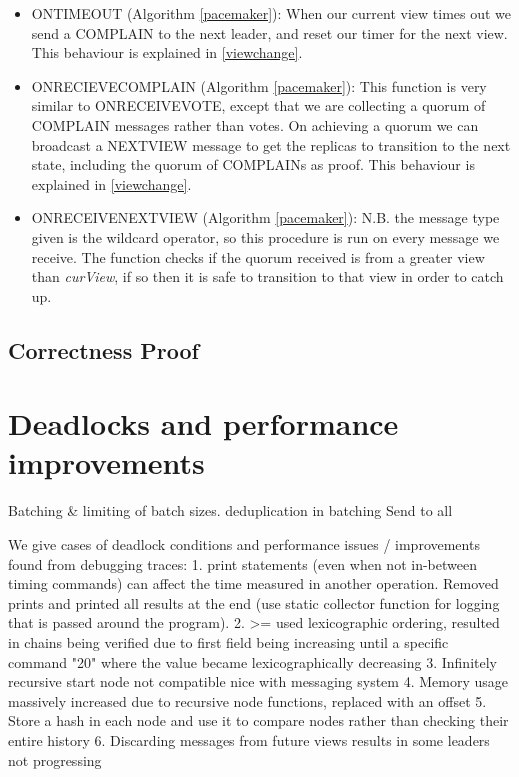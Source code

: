 \begin{itemize}
	\item ON{\large T}IMEOUT (Algorithm \ref{pacemaker}): When our current view times out we send a COMPLAIN to the next leader, and reset our timer for the next view. This behaviour is explained in \ref{viewchange}.
	\item ON{\large R}ECIEVE{\large C}OMPLAIN (Algorithm \ref{pacemaker}): This function is very similar to ON{\large R}ECEIVE{\large V}OTE, except that we are collecting a quorum of COMPLAIN messages rather than votes. On achieving a quorum we can broadcast a NEXT{\large V}IEW message to get the replicas to transition to the next state, including the quorum of COMPLAINs as proof. This behaviour is explained in \ref{viewchange}.
	\item ON{\large R}ECEIVE{\large N}EXT{\large V}IEW (Algorithm \ref{pacemaker}): N.B. the message type given is the wildcard operator, so this procedure is run on every message we receive. The function checks if the quorum received is from a greater view than \textit{curView}, if so then it is safe to transition to that view in order to catch up.
\end{itemize}

\subsection{Correctness Proof}

\section{Deadlocks and performance improvements} \label{deadlock}
Batching \& limiting of batch sizes. deduplication in batching
Send to all

We give cases of deadlock conditions
and performance issues / improvements found from debugging traces:
1. print statements (even when not in-between timing commands) can affect the time measured in another operation. Removed prints and printed all results at the end (use static collector function for logging that is passed around the program).
2. >= used lexicographic ordering, resulted in chains being verified due to first field being increasing until a specific command "20" where the value became lexicographically decreasing
3. Infinitely recursive start node not compatible nice with messaging system
4. Memory usage massively increased due to recursive node functions, replaced with an offset
5. Store a hash in each node and use it to compare nodes rather than checking their entire history
6. Discarding messages from future views results in some leaders not progressing
